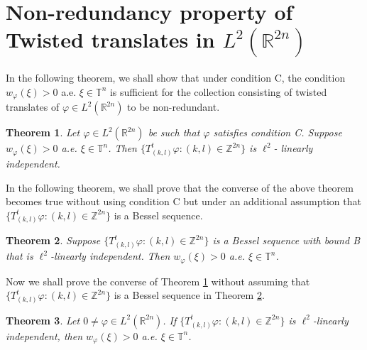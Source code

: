 \documentclass[a4paper,12pt,reqno]{amsart}
\theoremstyle{plain}
\newtheorem{thm}{Theorem}[section]
\numberwithin{equation}{section}
\theoremstyle{definition}
\begin{document}
\section{Non-redundancy property of Twisted translates in $L^{2}(\mathbb{R}^{2n})$}
In the following theorem, we shall show that under condition C, the condition $w_{\varphi}(\xi)> 0$ a.e. $\xi\in\mathbb{T}^{n}$ is sufficient for the collection consisting of twisted translates of $\varphi\in L^{2}(\mathbb{R}^{2n})$ to be non-redundant.
\begin{thm}\label{3pth2}
Let $\varphi\in L^{2}(\mathbb{R}^{2n})$ be such that $\varphi$ satisfies condition C. Suppose $w_{\varphi}(\xi)> 0$ a.e. $\xi\in\mathbb{T}^{n}$. Then $\{T_{(k,l)}^{t}\varphi:(k,l)\in \mathbb{Z}^{2n}\}$ is $\ell^{2}$- linearly independent.
\end{thm}
In the following theorem, we shall prove that the converse of the above theorem becomes true without using condition C but under an additional assumption that $\{T_{(k,l)}^{t}\varphi:(k,l)\in \mathbb{Z}^{2n}\}$ is a Bessel sequence.
\begin{thm}\label{3pth3}
Suppose $\{T_{(k,l)}^{t}\varphi:(k,l)\in \mathbb{Z}^{2n}\}$ is a Bessel sequence with bound B that is $\ell^{2}$-linearly independent. Then $w_{\varphi}(\xi)> 0$ a.e. $\xi\in\mathbb{T}^{n}$.
\end{thm}
Now we shall prove the converse of Theorem \ref{3pth2} without assuming that $\{T_{(k,l)}^{t}\varphi:(k,l)\in \mathbb{Z}^{2n}\}$ is a Bessel sequence in Theorem \ref{3pth3}.
\begin{thm}\label{3pth5}
Let $0\neq\varphi\in L^{2}(\mathbb{R}^{2n})$. If $\{T_{(k,l)}^{t}\varphi:(k,l)\in \mathbb{Z}^{2n}\}$ is $\ell^{2}$-linearly independent, then $w_{\varphi}(\xi)> 0$ a.e. $\xi\in\mathbb{T}^{n}$.
\end{thm}
\end{document}

